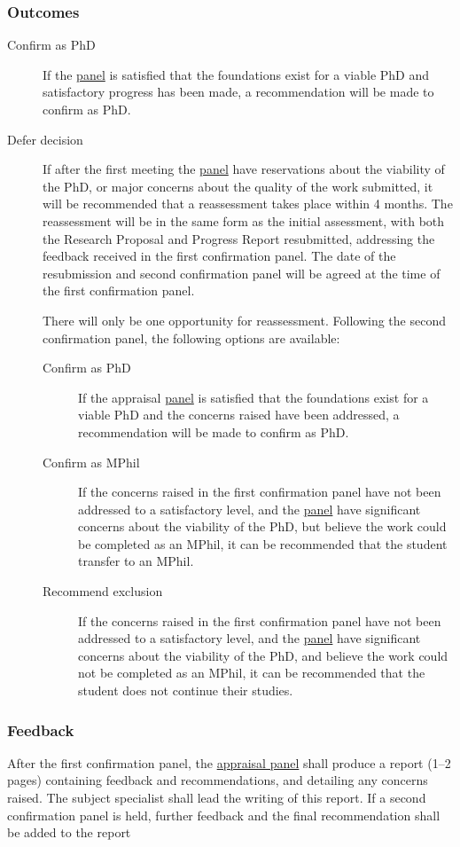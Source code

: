 \documentclass[12pt,a4paper]{article}
\begin{document}
\subsubsection{Outcomes}

\begin{description}
	\item[Confirm as PhD] If the \hyperref[sec:panel]{panel} is satisfied that the foundations exist for a viable PhD and satisfactory progress has been made, a recommendation will be made to confirm as PhD.
	\item[Defer decision] If after the first meeting the \hyperref[sec:panel]{panel} have reservations about the viability of the PhD, or major concerns about the quality of the work submitted, it will be recommended that a reassessment takes place within 4 months. The reassessment will be in the same form as the initial assessment, with both the Research Proposal and Progress Report resubmitted, addressing the feedback received in the first confirmation panel. The date of the resubmission and second confirmation panel will be agreed at the time of the first confirmation panel.
	
	There will only be one opportunity for reassessment. Following the second confirmation panel, the following options are available:
	\begin{description}
		\item[Confirm as PhD] If the appraisal \hyperref[sec:panel]{panel} is satisfied that the foundations exist for a viable PhD and the concerns raised have been addressed, a recommendation will be made to confirm as PhD.
		\item[Confirm as MPhil] If the concerns raised in the first confirmation panel have not been addressed to a satisfactory level, and the \hyperref[sec:panel]{panel} have significant concerns about the viability of the PhD, but believe the work could be completed as an MPhil, it can be recommended that the student transfer to an MPhil.
		\item[Recommend exclusion] If the concerns raised in the first confirmation panel have not been addressed to a satisfactory level, and the \hyperref[sec:panel]{panel} have significant concerns about the viability of the PhD, and believe the work could not be completed as an MPhil, it can be recommended that the student does not continue their studies.
	\end{description}
\end{description}

\subsubsection{Feedback}
After the first confirmation panel, the \hyperref[sec:panel]{appraisal panel} shall produce a report (1--2 pages) containing feedback and recommendations, and detailing any concerns raised. The subject specialist shall lead the writing of this report. If a second confirmation panel is held, further feedback and the final recommendation shall be added to the report
\end{document}
